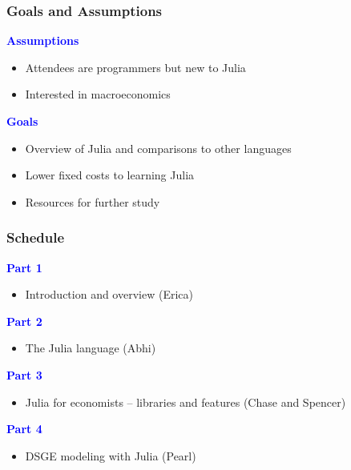\documentclass[
  xcolor={svgnames},
  hyperref={colorlinks,citecolor=DeepPink4,linkcolor=DarkRed,urlcolor=DarkBlue}
  ]{beamer}  %
\newcommand\boldblue[1]{\textcolor{blue}{\textbf{#1}}}
\begin{document}
\begin{frame}
  \frametitle{Goals and Assumptions}

  \vspace{1em}

  \boldblue{Assumptions}
  \begin{itemize}
    \item Attendees are programmers but new to Julia
    \item Interested in macroeconomics
  \end{itemize}

  \vspace{1em}

  \boldblue{Goals}
  \begin{itemize}
    \item Overview of Julia and comparisons to other languages
    \item Lower fixed costs to learning Julia
    \item Resources for further study
  \end{itemize}

\end{frame}

\begin{frame}
  \frametitle{Schedule}

  \boldblue{Part 1}
  \begin{itemize}
    \item Introduction and overview (Erica)
  \end{itemize}

  \vspace{1em}
  \boldblue{Part 2}
  \begin{itemize}
    \item The Julia language (Abhi)
  \end{itemize}

  \vspace{1em}
  \boldblue{Part 3}
  \begin{itemize}
    \item Julia for economists -- libraries and features (Chase and Spencer)
  \end{itemize}

  \vspace{1em}
  \boldblue{Part 4}
  \begin{itemize}
    \item DSGE modeling with Julia (Pearl)
  \end{itemize}
\end{frame}
\end{document}
